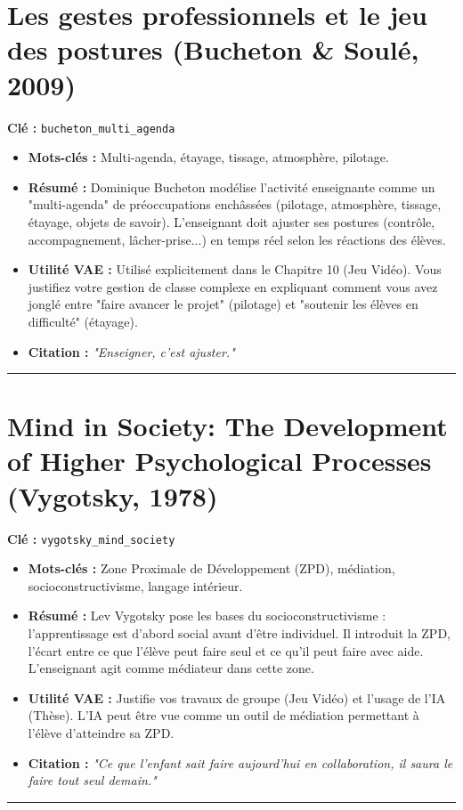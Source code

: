 \section{Les gestes professionnels et le jeu des postures (Bucheton \& Soulé, 2009)}
\textbf{Clé :} \texttt{bucheton\_multi\_agenda}
\begin{itemize}
    \item \textbf{Mots-clés :} Multi-agenda, étayage, tissage, atmosphère, pilotage.
    \item \textbf{Résumé :} Dominique Bucheton modélise l'activité enseignante comme un "multi-agenda" de préoccupations enchâssées (pilotage, atmosphère, tissage, étayage, objets de savoir). L'enseignant doit ajuster ses postures (contrôle, accompagnement, lâcher-prise...) en temps réel selon les réactions des élèves.
    \item \textbf{Utilité VAE :} Utilisé explicitement dans le Chapitre 10 (Jeu Vidéo). Vous justifiez votre gestion de classe complexe en expliquant comment vous avez jonglé entre "faire avancer le projet" (pilotage) et "soutenir les élèves en difficulté" (étayage).
    \item \textbf{Citation :} \textit{"Enseigner, c'est ajuster."}
\end{itemize}
\hrule

\section{Mind in Society: The Development of Higher Psychological Processes (Vygotsky, 1978)}
\textbf{Clé :} \texttt{vygotsky\_mind\_society}
\begin{itemize}
    \item \textbf{Mots-clés :} Zone Proximale de Développement (ZPD), médiation, socioconstructivisme, langage intérieur.
    \item \textbf{Résumé :} Lev Vygotsky pose les bases du socioconstructivisme : l'apprentissage est d'abord social avant d'être individuel. Il introduit la ZPD, l'écart entre ce que l'élève peut faire seul et ce qu'il peut faire avec aide. L'enseignant agit comme médiateur dans cette zone.
    \item \textbf{Utilité VAE :} Justifie vos travaux de groupe (Jeu Vidéo) et l'usage de l'IA (Thèse). L'IA peut être vue comme un outil de médiation permettant à l'élève d'atteindre sa ZPD.
    \item \textbf{Citation :} \textit{"Ce que l'enfant sait faire aujourd'hui en collaboration, il saura le faire tout seul demain."}
\end{itemize}
\hrule

